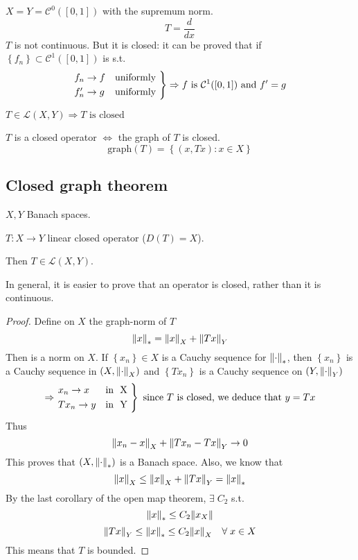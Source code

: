 \begin{example}
    \(X = Y = \mathcal{C}^0([0,1])\) with the supremum norm.
    \[
        T = \frac{d}{dx}
    \]
    \(T\) is not continuous. But it is closed: it can be proved that if \(\left\{ f_n \right\} \subset \mathcal{C}^1([0,1])\) is s.t.
    \[
        \begin{rcases*}
            f_n \to f & \mbox{uniformly} \\
            f_n' \to g & \mbox{uniformly}
        \end{rcases*} \Rightarrow f \mbox{ is } \mathcal{C}^1([0,1]) \mbox{ and } f' = g
    \] 
\end{example}
\begin{example}
    \(T \in \mathcal{L}(X,Y) \Rightarrow T \mbox{ is closed}\)
\end{example}
\begin{remark}
    \(T\) is a closed operator \(\Leftrightarrow\) the graph of \(T\) is closed.
    \[
        \mbox{graph}(T) = \left\{ (x, Tx): x \in X \right\}
    \]
\end{remark}
\subsection{Closed graph theorem}
\begin{theorem}
    \(X, Y\) Banach spaces. 
    
    \(T : X \to Y\) linear closed operator (\(D(T) = X\)). 
    
    Then \(T \in \mathcal{L}(X,Y)\).
\end{theorem}
\begin{remark}
    In general, it is easier to prove that an operator is closed, rather than it is continuous.
\end{remark}
\begin{proof}
    Define on \(X\) the graph-norm of \(T\)
    \[
        \norm{x}_* = \norm{x}_X + \norm{Tx}_Y
    \]
    Then is a norm on \(X\). If \(\left\{ x_n \right\} \in X\) is a Cauchy sequence for \(\norm{\cdot}_*\), then \(\left\{ x_n \right\}\) is a Cauchy sequence in \((X, \norm{\cdot}_X)\) and \(\left\{ Tx_n \right\}\) is a Cauchy sequence on \((Y, \norm{\cdot}_Y)\)
    \[
        \Rightarrow \begin{rcases*}
            x_n \to x & \mbox{in } X \\
            Tx_n \to y & \mbox{in } Y
        \end{rcases*} \mbox{ since } T \mbox{ is closed, we deduce that } y = Tx
    \]
    Thus 
    \[
        \norm{x_n - x}_X + \norm{Tx_n - Tx}_Y \to 0
    \]
    This proves that \((X, \norm{\cdot}_*)\) is a Banach space. Also, we know that 
    \[
        \norm{x}_X \leq \norm{x}_X + \norm{Tx}_Y = \norm{x}_*
    \]
    By the last corollary of the open map theorem, \(\exists \; C_2\) s.t. 
    \[
        \norm{x}_* \leq C_2 \norm{x_X}
    \]
    \[
        \norm{Tx}_Y \leq \norm{x}_* \leq C_2 \norm{x}_X \quad \forall \; x \in X
    \]
    This means that \(T\) is bounded.
\end{proof}